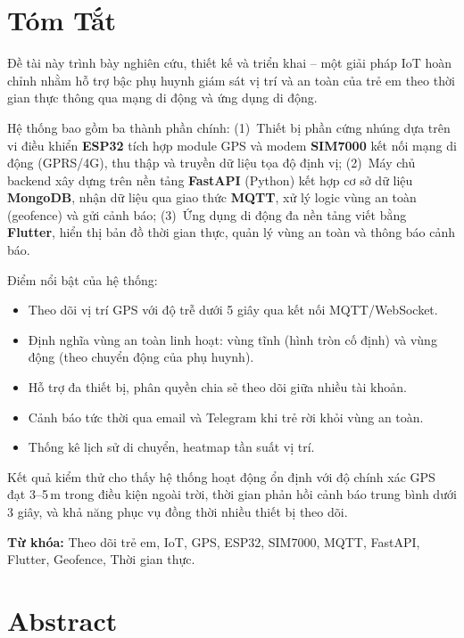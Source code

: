\chapter*{Tóm Tắt}

Đề tài này trình bày nghiên cứu, thiết kế và triển khai \textbf{\systemname{}} -- một giải pháp IoT hoàn chỉnh nhằm hỗ trợ bậc phụ huynh giám sát vị trí và an toàn của trẻ em theo thời gian thực thông qua mạng di động và ứng dụng di động.

\medskip
Hệ thống bao gồm ba thành phần chính: (1)~Thiết bị phần cứng nhúng dựa trên vi điều khiển \textbf{ESP32} tích hợp module GPS và modem \textbf{SIM7000} kết nối mạng di động (GPRS/4G), thu thập và truyền dữ liệu tọa độ định vị; (2)~Máy chủ backend xây dựng trên nền tảng \textbf{FastAPI} (Python) kết hợp cơ sở dữ liệu \textbf{MongoDB}, nhận dữ liệu qua giao thức \textbf{MQTT}, xử lý logic vùng an toàn (geofence) và gửi cảnh báo; (3)~Ứng dụng di động đa nền tảng viết bằng \textbf{Flutter}, hiển thị bản đồ thời gian thực, quản lý vùng an toàn và thông báo cảnh báo.

\medskip
Điểm nổi bật của hệ thống:
\begin{itemize}[noitemsep]
  \item Theo dõi vị trí GPS với độ trễ dưới 5 giây qua kết nối MQTT/WebSocket.
  \item Định nghĩa vùng an toàn linh hoạt: vùng tĩnh (hình tròn cố định) và vùng động (theo chuyển động của phụ huynh).
  \item Hỗ trợ đa thiết bị, phân quyền chia sẻ theo dõi giữa nhiều tài khoản.
  \item Cảnh báo tức thời qua email và Telegram khi trẻ rời khỏi vùng an toàn.
  \item Thống kê lịch sử di chuyển, heatmap tần suất vị trí.
\end{itemize}

\medskip
Kết quả kiểm thử cho thấy hệ thống hoạt động ổn định với độ chính xác GPS đạt 3--5\,m trong điều kiện ngoài trời, thời gian phản hồi cảnh báo trung bình dưới 3 giây, và khả năng phục vụ đồng thời nhiều thiết bị theo dõi.

\medskip
\noindent\textbf{Từ khóa:} Theo dõi trẻ em, IoT, GPS, ESP32, SIM7000, MQTT, FastAPI, Flutter, Geofence, Thời gian thực.

\clearpage

\chapter*{Abstract}

